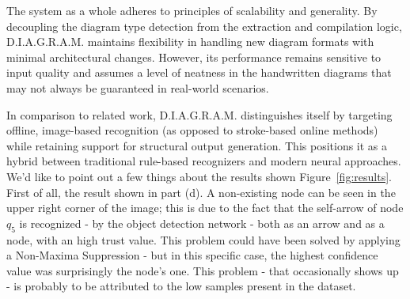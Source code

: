 \documentclass[conference]{IEEEtran}
\begin{document}
The system as a whole adheres to principles of scalability and generality. By decoupling the diagram type detection from the extraction and compilation logic, D.I.A.G.R.A.M. maintains flexibility in handling new diagram formats with minimal architectural changes. However, its performance remains sensitive to input quality and assumes a level of neatness in the handwritten diagrams that may not always be guaranteed in real-world scenarios.

In comparison to related work, D.I.A.G.R.A.M. distinguishes itself by targeting offline, image-based recognition (as opposed to stroke-based online methods) while retaining support for structural output generation. This positions it as a hybrid between traditional rule-based recognizers and modern neural approaches. \\

We'd like to point out a few things about the results shown Figure~\ref{fig:results}. First of all, the result shown in part (d). A non-existing node can be seen in the upper right corner of the image; this is due to the fact that the self-arrow of node $q_5$ is recognized - by the object detection network - both as an arrow and as a node, with an high trust value. This problem could have been solved by applying a Non-Maxima Suppression - but in this specific case, the highest confidence value was surprisingly the node's one. This problem - that occasionally shows up - is probably to be attributed to the low samples present in the dataset.
\end{document}
